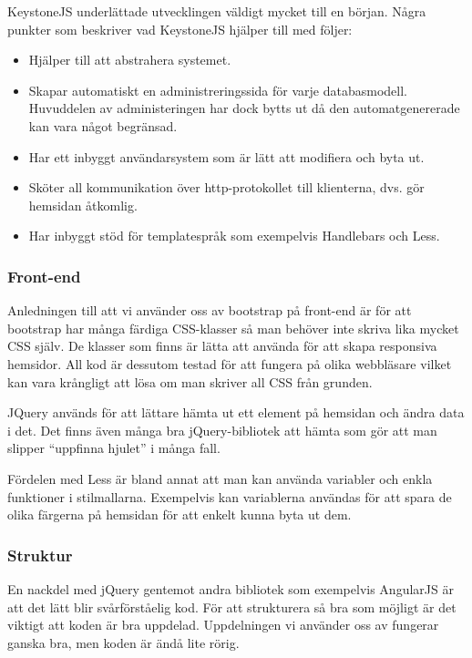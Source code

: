 \documentclass{article}
\begin{document}
KeystoneJS underlättade utvecklingen väldigt mycket till en början. Några punkter som beskriver vad KeystoneJS hjälper till med följer:

  \begin{itemize}
    \item Hjälper till att abstrahera systemet.
    \item Skapar automatiskt en administreringssida för varje databasmodell.
      Huvuddelen av administeringen har dock bytts ut då den automatgenererade kan vara något begränsad.
    \item Har ett inbyggt användarsystem som är lätt att modifiera och byta ut.
    \item Sköter all kommunikation över http-protokollet till klienterna, dvs. gör hemsidan åtkomlig.
    \item Har inbyggt stöd för templatespråk som exempelvis Handlebars \cite{handlebars} och Less.
  \end{itemize}
  
\subsubsection{Front-end}
Anledningen till att vi använder oss av bootstrap på front-end är för att bootstrap har många färdiga CSS-klasser så man behöver inte skriva lika mycket CSS själv.
De klasser som finns är lätta att använda för att skapa responsiva hemsidor.
All kod är dessutom testad för att fungera på olika webbläsare vilket kan vara krångligt att lösa om man skriver all CSS från grunden.

JQuery används för att lättare hämta ut ett element på hemsidan och ändra data i det.
Det finns även många bra jQuery-bibliotek att hämta som gör att man slipper “uppfinna hjulet” i många fall.

Fördelen med Less är bland annat att man kan använda variabler och enkla funktioner i stilmallarna.
Exempelvis kan variablerna användas för att spara de olika färgerna på hemsidan för att enkelt kunna byta ut dem.

\subsubsection{Struktur}
En nackdel med jQuery gentemot andra bibliotek som exempelvis AngularJS \cite{angular} är att det lätt blir svårförståelig kod.
För att strukturera så bra som möjligt är det viktigt att koden är bra uppdelad.
Uppdelningen vi använder oss av fungerar ganska bra, men koden är ändå lite rörig.
\end{document}
